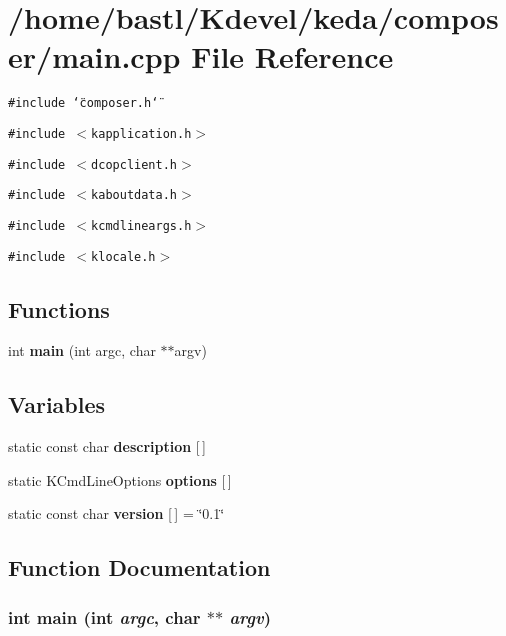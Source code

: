 \section{/home/bastl/Kdevel/keda/composer/main.cpp File Reference}
\label{composer_2main_8cpp}
{\tt \#include \char`\"{}composer.h\char`\"{}}\par
{\tt \#include $<$kapplication.h$>$}\par
{\tt \#include $<$dcopclient.h$>$}\par
{\tt \#include $<$kaboutdata.h$>$}\par
{\tt \#include $<$kcmdlineargs.h$>$}\par
{\tt \#include $<$klocale.h$>$}\par
\subsection*{Functions}
\begin{CompactItemize}
\item 
int {\bf main} (int argc, char $\ast$$\ast$argv)
\end{CompactItemize}
\subsection*{Variables}
\begin{CompactItemize}
\item 
static const char {\bf description} [$\,$]
\item 
static KCmd\-Line\-Options {\bf options} [$\,$]
\item 
static const char {\bf version} [$\,$] = \char`\"{}0.1\char`\"{}
\end{CompactItemize}


\subsection{Function Documentation}
\subsubsection{\setlength{\rightskip}{0pt plus 5cm}int main (int {\em argc}, char $\ast$$\ast$ {\em argv})}\label{composer_2main_8cpp_30c4c19ff69d905e8e4c750b3af23485}




